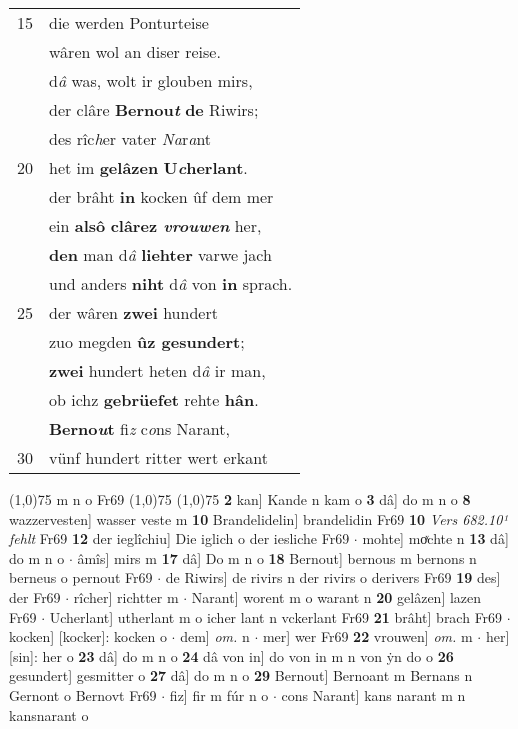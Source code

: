 \documentclass[8pt,a4paper,notitlepage]{article}
\begin{document}
\begin{table}[ht]
\begin{minipage}[t]{0.5\linewidth}
\begin{tabular}{rl}
15 & die werden Ponturteise\\ 
 & wâren wol an diser reise.\\ 
 & d\textit{â} was, wolt ir glouben mirs,\\ 
 & der clâre \textbf{Bernou\textit{t}} \textbf{de} Riwirs;\\ 
 & des rîc\textit{h}er vater \textit{Na}r\textit{a}nt\\ 
20 & het im \textbf{gelâzen} \textbf{U\textit{c}herlant}.\\ 
 & der brâht \textbf{in} kocken ûf dem mer\\ 
 & ein \textbf{alsô} \textbf{clârez \textit{vrouwen}} her,\\ 
 & \textbf{den} man d\textit{â} \textbf{liehter} varwe jach\\ 
 & und anders \textbf{niht} d\textit{â} von \textbf{in} sprach.\\ 
25 & der wâren \textbf{zwei} hundert\\ 
 & zuo megden \textbf{ûz gesundert};\\ 
 & \textbf{zwei} hundert heten d\textit{â} ir man,\\ 
 & ob ichz \textbf{gebrüefet} rehte \textbf{hân}.\\ 
 & \textbf{Berno\textit{u}t} fi\textit{z} c\textit{o}ns Narant,\\ 
30 & vünf hundert ritter wert erkant\\ 
\end{tabular}
\scriptsize
\line(1,0){75} \newline
m n o Fr69 \newline
\line(1,0){75} \newline
\newline
\line(1,0){75} \newline
\textbf{2} kan] Kande n kam o \textbf{3} dâ] do m n o \textbf{8} wazzervesten] wasser veste m \textbf{10} Brandelidelin] brandelidin Fr69 \textbf{10} \textit{Vers 682.10¹ fehlt} Fr69  \textbf{12} der ieglîchiu] Die iglich o der iesliche Fr69  $\cdot$ mohte] moͯchte n \textbf{13} dâ] do m n o  $\cdot$ âmîs] mirs m \textbf{17} dâ] Do m n o \textbf{18} Bernout] bernous m bernons n berneus o pernout Fr69  $\cdot$ de Riwirs] de rivirs n der rivirs o derivers Fr69 \textbf{19} des] der Fr69  $\cdot$ rîcher] richtter m  $\cdot$ Narant] worent m o warant n \textbf{20} gelâzen] lazen Fr69  $\cdot$ Ucherlant] utherlant m o icher lant n vckerlant Fr69 \textbf{21} brâht] brach Fr69  $\cdot$ kocken] [kocker]: kocken o  $\cdot$ dem] \textit{om.} n  $\cdot$ mer] wer Fr69 \textbf{22} vrouwen] \textit{om.} m  $\cdot$ her] [sin]: her o \textbf{23} dâ] do m n o \textbf{24} dâ von in] do von in m n von ẏn do o \textbf{26} gesundert] gesmitter o \textbf{27} dâ] do m n o \textbf{29} Bernout] Bernoant m Bernans n Gernont o Bernovt Fr69  $\cdot$ fiz] fir m fúr n o  $\cdot$ cons Narant] kans narant m n kansnarant o \newline
\end{minipage}
\end{table}
\end{document}
